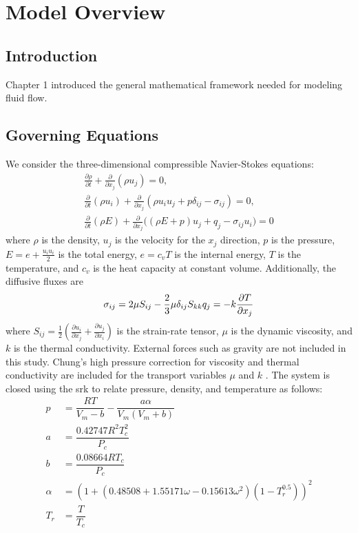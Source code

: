 \chapter{Model Overview}
\section{Introduction}
Chapter 1 introduced the general mathematical framework needed for modeling fluid flow. 
\section{Governing Equations}

We consider the three-dimensional compressible Navier-Stokes equations:
\begin{equation} \label{NSE}
\begin{split}
  \frac{\partial\rho}{\partial t} + \frac{\partial }{\partial x_j} \left( \rho u_j \right) = 0,  \\
  \frac{\partial}{\partial t} \left( \rho u_i \right) + \frac{\partial}{\partial x_j} \left(\rho u_i u_j + p \delta_{ij} -\sigma_{ij} \right) = 0,  \\
  \frac{\partial}{\partial t} \left( \rho E \right) + \frac{\partial}{\partial x_j} \big(\left( \rho E+p \right) u_j + q_j - \sigma_{ij} u_i\big) = 0 
\end{split}
\end{equation}
where $\rho$ is the density, $u_j$ is the velocity for the $x_j$ direction, $p$ is the pressure, $E = e + \frac{u_i u_i}{2}$ is the total energy, $e = c_v T$ is the internal energy, $T$ is the temperature, and $c_v$ is the heat capacity at constant volume. Additionally, the diffusive fluxes are
\begin{equation}
  \sigma_{ij} = 2\mu S_{ij} - \frac{2}{3}\mu \delta_{ij} S_{kk}\\
  q_j = -k \frac{\partial T}{\partial x_j}
\end{equation}
where
$S_{ij} = \frac{1}{2}\left(\frac{\partial u_i}{\partial x_j} + \frac{\partial u_j}{\partial x_i} \right)$ is the strain-rate tensor, $\mu$ is the dynamic viscosity, and $k$ is the thermal conductivity. External forces such as gravity are not included in this study. Chung's high pressure correction for viscosity and thermal conductivity are included for the transport variables $\mu$ and $k$ \cite{chung:1988}. The system is closed using the \gls{srk} \cite{SOAVE1972} to relate pressure, density, and temperature as follows:
\begin{align} 
	p &= \dfrac{RT}{V_m - b} - \dfrac{a \alpha}{V_m(V_m + b)} \label{SRK eq} \\
	a &= \dfrac{0.42747R^2T_c^2}{P_c} \label{SRKa} \\
	b &= \dfrac{0.08664RT_c}{P_c} \label{SRKb} \\
	\alpha &= \left( 1 + \left( 0.48508 + 1.55171 \omega - 0.15613 \omega^2 \right)\left( 1 - T_r^{0.5} \right) \right)^2 \label{SRKalpha} \\
	T_r &= \dfrac{T}{T_c} \label{Treduced}
\end{align}
